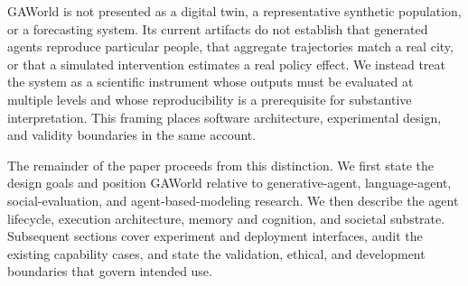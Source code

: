GAWorld is not presented as a digital twin, a representative synthetic
population, or a forecasting system.  Its current artifacts do not establish
that generated agents reproduce particular people, that aggregate trajectories
match a real city, or that a simulated intervention estimates a real policy
effect.  We instead treat the system as a scientific instrument whose outputs
must be evaluated at multiple levels and whose reproducibility is a prerequisite
for substantive interpretation.  This framing places software architecture,
experimental design, and validity boundaries in the same account.

The remainder of the paper proceeds from this distinction.  We first state
the design goals and position GAWorld relative to generative-agent,
language-agent, social-evaluation, and agent-based-modeling research.  We then
describe the agent lifecycle, execution architecture, memory and cognition,
and societal substrate.  Subsequent sections cover experiment and deployment
interfaces, audit the existing capability cases, and state the validation,
ethical, and development boundaries that govern intended use.
